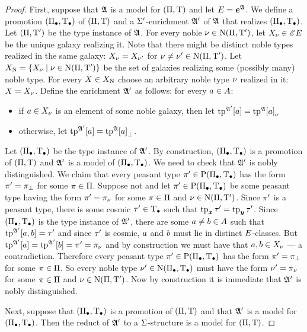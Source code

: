 \begin{proof}
First, suppose that $\mathfrak{A}$ is a model for $(\Pi,\mathrm{T})$ and let $E
= \bm{e}^{\mathfrak{A}}$.
We define a promotion $(\Pi_{\bullet},\mathrm{T}_{\bullet})$ of $(\Pi,\mathrm{T})$ and
a $\mathrm{\Sigma'}$-enrichment $\mathfrak{A'}$ of $\mathfrak{A}$ that realizes $(\Pi_{\bullet},\mathrm{T}_{\bullet})$.
Let $(\Pi,{\mathrm{T}'})$ be the type instance of $\mathfrak{A}$.
For every noble $\nu \in \mathrm{\mathrm{N}}(\Pi,{\mathrm{T}'})$, let $X_\nu \in {\mathscr{E}E}$ be
the unique galaxy realizing it. Note that there might be distinct noble types
realized in the same galaxy: 
$X_\nu = X_{\nu'}$ for $\nu \neq {\nu'} \in \mathrm{\mathrm{N}}(\Pi,{\mathrm{T}'})$.
Let $X_{\mathrm{\mathrm{N}}} = \left\{X_\nu\mathrel{}\middle|\mathrel{}\nu \in \mathrm{\mathrm{N}}(\Pi,{\mathrm{T}'})\right\}$ be the set of
galaxies realizing some (possibly many) noble type. For every $X \in
X_{\mathrm{\mathrm{N}}}$ choose an arbitrary noble type $\nu$ realized in it: $X =
X_\nu$.
Define the enrichment $\mathfrak{A'}$ as follows: for every $a \in A$:
\begin{itemize}
  \item if $a \in X_\nu$ is an element of some noble galaxy, then let
$\operatorname{tp}^{\mathfrak{A'}}[a] = {\operatorname{tp}^{\mathfrak{A}}[a]}_{\nu}$
  \item otherwise, let $\operatorname{tp}^{\mathfrak{A'}}[a] = {\operatorname{tp}^{\mathfrak{A}}[a]}_{\bot}$.
\end{itemize}
Let $(\Pi_{\bullet},\mathrm{T}_{\bullet})$ be the type instance of $\mathfrak{A'}$. By construction,
$(\Pi_{\bullet},\mathrm{T}_{\bullet})$ is a promotion of $(\Pi,\mathrm{T})$ and $\mathfrak{A'}$ is a
model of $(\Pi_{\bullet},\mathrm{T}_{\bullet})$.
We need to check that $\mathfrak{A'}$ is nobly distinguished.
We claim that every peasant type ${\pi'} \in \mathrm{P}(\Pi_{\bullet},\mathrm{T}_{\bullet})$ has the form
${\pi'} = {\pi}_{\bot}$ for some $\pi\in\Pi$.
Suppose not and let ${\pi'}\in \mathrm{P}(\Pi_{\bullet},\mathrm{T}_{\bullet})$ be some peasant type having
the form ${\pi'} = {\pi}_{\nu}$ for some $\pi\in\Pi$ and
$\nu\in\mathrm{\mathrm{N}}(\Pi,{\mathrm{T}'})$. 
Since ${\pi'}$ is a peasant type, there is some cosmic ${\tau'} \in \mathrm{T}_{\bullet}$ such
that $\operatorname{tp}_{\bm{x}}{\tau'} = \operatorname{tp}_{\bm{y}}{\tau'}$. Since $(\Pi_{\bullet},\mathrm{T}_{\bullet})$ is the type instance of
$\mathfrak{A'}$, there are some $a \neq b \in A$ such that $\operatorname{tp}^{\mathfrak{A'}}[a,b] = {\tau'}$ and
since ${\tau'}$ is cosmic, $a$ and $b$ must lie in distinct $E$-classes.
But $\operatorname{tp}^{\mathfrak{A'}}[a] = \operatorname{tp}^{\mathfrak{A'}}[b] = {\pi'} = {\pi}_{\nu}$ and by
construction we must have that $a, b \in X_\nu$ --- a contradiction.
Therefore every peasant type ${\pi'} \in \mathrm{P}(\Pi_{\bullet},\mathrm{T}_{\bullet})$ has the form
${\pi'} = {\pi}_{\bot}$ for some $\pi \in \Pi$. So every noble type ${\nu'}
\in \mathrm{\mathrm{N}}(\Pi_{\bullet},\mathrm{T}_{\bullet})$ must have the form ${\nu'} = {\pi}_{\nu}$ for some
$\pi \in \Pi$ and $\nu \in \mathrm{\mathrm{N}}(\Pi,{\mathrm{T}'})$. Now by construction it is
immediate that $\mathfrak{A'}$ is nobly distinguished.

Next, suppose that $(\Pi_{\bullet},\mathrm{T}_{\bullet})$ is a promotion of $(\Pi,\mathrm{T})$ and
that $\mathfrak{A'}$ is a model for $(\Pi_{\bullet},\mathrm{T}_{\bullet})$. Then the reduct of $\mathfrak{A'}$
to a $\mathrm{\Sigma}$-structure is a model for $(\Pi,\mathrm{T})$.
\end{proof}
